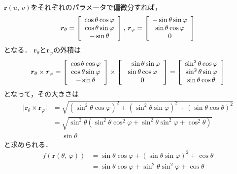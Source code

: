 $\bm{r}(u, \, v)$をそれぞれのパラメータで偏微分すれば，
\begin{align*}
\bm{r}_\theta = \left[
\renewcommand{\arraystretch}{1}
\begin{array}{c}
\cos \theta \cos \varphi \\
\cos \theta \sin \varphi \\
- \sin \theta
\end{array}
\right] ,  \,
\bm{r}_\varphi = \left[
\renewcommand{\arraystretch}{1}
\begin{array}{c}
 - \sin \theta \sin \varphi \\
\sin \theta \cos \varphi \\
0
\end{array}
\right]
\end{align*}
となる．
$\bm{r}_\theta$と$\bm{r}_\varphi$の外積は
\begin{align*}
\bm{r}_\theta \times \bm{r}_\varphi
=  \left[
\renewcommand{\arraystretch}{1}
\begin{array}{c}
\cos \theta \cos \varphi \\
\cos \theta \sin \varphi \\
- \sin \theta
\end{array}
\right] \times 
\left[
\renewcommand{\arraystretch}{1}
\begin{array}{c}
 - \sin \theta \sin \varphi \\
\sin \theta \cos \varphi \\
0
\end{array}
\right]
= \left[ 
\renewcommand{\arraystretch}{1}
\begin{array}{c}
\sin ^2 \theta \cos \varphi \\
\sin^2 \theta \sin \varphi \\
\sin \theta \cos \theta 
\end{array}
\right]
\end{align*}
となって，その大きさは
\begin{align*}
\lvert \bm{r}_\theta \times \bm{r}_\varphi \rvert
& = \sqrt{ ( \sin ^2 \theta \cos \varphi )^2+
( \sin^2 \theta \sin \varphi )^2 + 
( \sin \theta \cos \theta ) ^2 } \\
& = \sqrt{ \sin^2 \theta ( \sin^2 \theta \cos ^2 \varphi 
+ \sin^2 \theta \sin^2 \varphi + 
\cos^2 \theta ) } \\
& = \sin \theta 
\end{align*}
と求められる．
\begin{align*}
f (\bm{r} (\theta, \, \varphi) ) & = \sin \theta \cos \varphi + (\sin \theta \sin \varphi)^2 + \cos \theta \\
& = \sin \theta \cos \varphi + \sin^2 \theta \sin^2  \varphi + \cos \theta
\end{align*}

